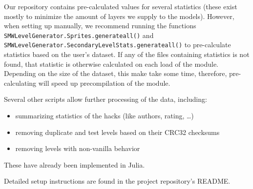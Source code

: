 Our repository contains pre-calculated values for several statistics
(these exist mostly to minimize the amount of layers we supply to the
models). However, when setting up manually, we recommend running the
functions \texttt{SMWLevelGenerator.Sprites.generateall()} and
\texttt{SMWLevelGenerator.SecondaryLevelStats.generateall()} to
pre-calculate statistics based on the user's dataset. If any of the
files containing statistics is not found, that statistic is otherwise
calculated on each load of the module. Depending on the size of the
dataset, this make take some time, therefore, pre-calculating will
speed up precompilation of the module.
\medskip

Several other scripts allow further processing of the data, including:
\begin{itemize}
\item summarizing statistics of the hacks (like authors, rating,
  \dots)
\item removing duplicate and test levels based on their CRC32
  checksums
\item removing levels with non-vanilla behavior
\end{itemize}
These have already been implemented in Julia.

Detailed setup instructions are found in the project repository's
README.


